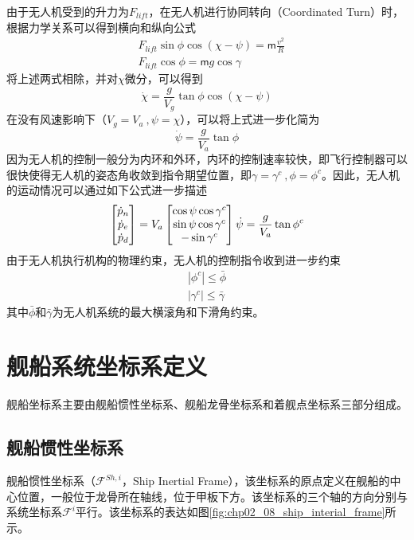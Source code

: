 由于无人机受到的升力为$F_{lift}$，在无人机进行协同转向（Coordinated Turn）时，根据力学关系可以得到横向和纵向公式
\begin{align}
&F_{lift} \sin \phi \cos (\chi - \psi) = \mathsf{m} \frac{v^2}{R}  \\
&F_{lift } \cos \phi = \mathsf{m} g \cos \gamma
\end{align}
将上述两式相除，并对$\chi$微分，可以得到
\begin{equation}
\dot{\chi} = \frac{g}{V_g} \tan \phi \cos (\chi - \psi)
\end{equation}
在没有风速影响下（$V_g = V_a\ , \psi = \chi$），可以将上式进一步化简为
\begin{equation}
\dot{\psi} =\frac{g}{V_a} \tan \phi
\end{equation}
因为无人机的控制一般分为内环和外环，内环的控制速率较快，即飞行控制器可以很快使得无人机的姿态角收敛到指令期望位置，即$\gamma = \gamma^c\ , \phi = \phi^c$。因此，无人机的运动情况可以通过如下公式进一步描述
\begin{equation}
\begin{bmatrix} \dot{p}_n \\\dot{p}_e \\ \dot{p}_d \end{bmatrix}  = {V}_a \begin{bmatrix} \cos \psi \cos \gamma^c \\ \sin \psi \cos \gamma^c  \\- \sin \gamma^c \end{bmatrix} \\
\dot{\psi} =\frac{g}{V_a} \tan \phi^c
\end{equation}
由于无人机执行机构的物理约束，无人机的控制指令收到进一步约束
\begin{align}
|\phi^c| \le \bar{\phi} \\
|\gamma^c| \le \bar{\gamma}
\end{align}
其中$\bar{\phi}$和$\bar{\gamma}$为无人机系统的最大横滚角和下滑角约束。


\section{舰船系统坐标系定义}

舰船坐标系主要由舰船惯性坐标系、舰船龙骨坐标系和着舰点坐标系三部分组成。
\subsection{舰船惯性坐标系}
舰船惯性坐标系（$\mathcal{F}^{Sh,i}$，Ship Inertial Frame），该坐标系的原点定义在舰船的中心位置，一般位于龙骨所在轴线，位于甲板下方。该坐标系的三个轴的方向分别与系统坐标系$\mathcal{F}^i$平行。该坐标系的表达如图\ref{fig:chp02_08_ship_interial_frame}所示。

